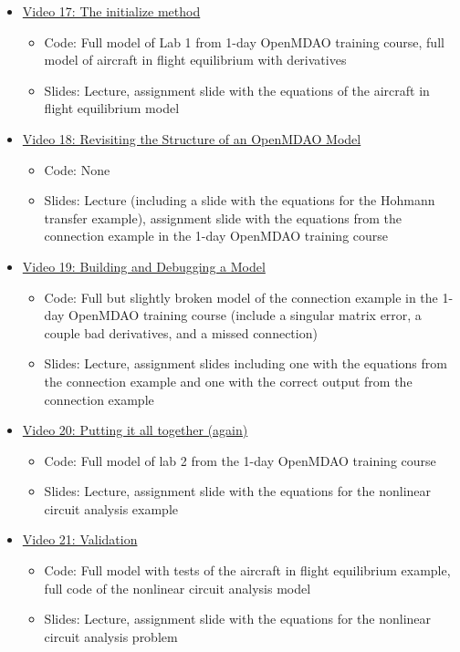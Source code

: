 \documentclass[12pt, letterpaper]{article}
\begin{document}
\begin{itemize}
	\item \underline{Video 17: The initialize method} 
		\begin{itemize}
			\item Code: Full model of Lab 1 from 1-day OpenMDAO training course, full model of aircraft in flight equilibrium with derivatives
			\item Slides: Lecture, assignment slide with the equations of the aircraft in flight equilibrium model
		\end{itemize}
		
	\item \underline{Video 18: Revisiting the Structure of an OpenMDAO Model} 
		\begin{itemize}
			\item Code: None
			\item Slides: Lecture (including a slide with the equations for the Hohmann transfer example), assignment slide with the equations from the connection example in the 1-day OpenMDAO training course
		\end{itemize}	
		
	\item \underline{Video 19: Building and Debugging a Model} 
		\begin{itemize}
			\item Code: Full but slightly broken model of the connection example in the 1-day OpenMDAO training course (include a singular matrix error, a couple bad derivatives, and a missed connection)
			\item Slides: Lecture, assignment slides including one with the equations from the connection example and one with the correct output from the connection example
		\end{itemize}
		
	\item \underline{Video 20: Putting it all together (again)} 
		\begin{itemize}
			\item Code: Full model of lab 2 from the 1-day OpenMDAO training course
			\item Slides: Lecture, assignment slide with the equations for the nonlinear circuit analysis example
		\end{itemize}
		
	\item \underline{Video 21: Validation} 
		\begin{itemize}
			\item Code: Full model with tests of the aircraft in flight equilibrium example, full code of the nonlinear circuit analysis model 
			\item Slides: Lecture, assignment slide with the equations for the nonlinear circuit analysis problem
		\end{itemize}
	

\end{itemize}
\end{document}
